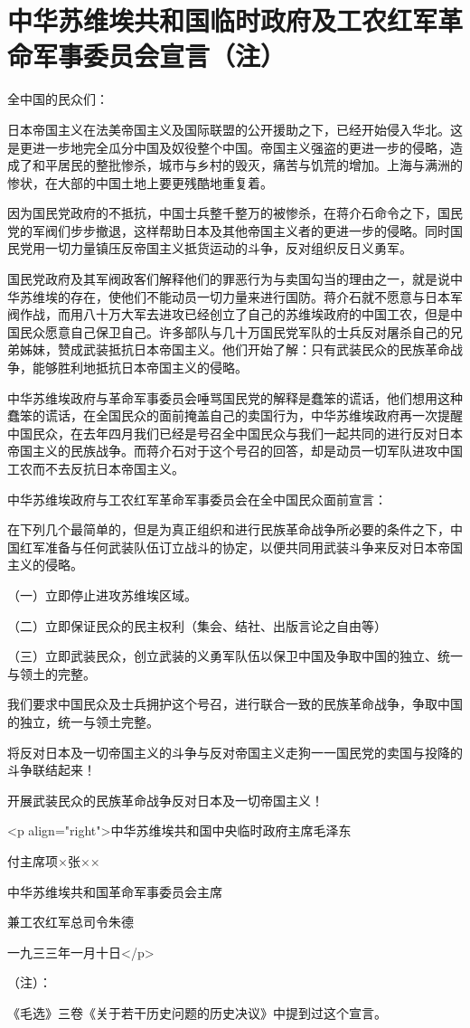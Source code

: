 \section[中华苏维埃共和国临时政府及工农红军革命军事委员会宣言（注）（一九三三年一月十日）]{中华苏维埃共和国临时政府及工农红军革命军事委员会宣言（注）}


全中国的民众们：

日本帝国主义在法美帝国主义及国际联盟的公开援助之下，已经开始侵入华北。这是更进一步地完全瓜分中国及奴役整个中国。帝国主义强盗的更进一步的侵略，造成了和平居民的整批惨杀，城市与乡村的毁灭，痛苦与饥荒的增加。上海与满洲的惨状，在大部的中国土地上要更残酷地重复着。

因为国民党政府的不抵抗，中国士兵整千整万的被惨杀，在蒋介石命令之下，国民党的军阀们步步撤退，这样帮助日本及其他帝国主义者的更进一步的侵略。同时国民党用一切力量镇压反帝国主义抵货运动的斗争，反对组织反日义勇军。

国民党政府及其军阀政客们解释他们的罪恶行为与卖国勾当的理由之一，就是说中华苏维埃的存在，使他们不能动员一切力量来进行国防。蒋介石就不愿意与日本军阀作战，而用八十万大军去进攻已经创立了自己的苏维埃政府的中国工农，但是中国民众愿意自己保卫自己。许多部队与几十万国民党军队的士兵反对屠杀自己的兄弟姊妹，赞成武装抵抗日本帝国主义。他们开始了解：只有武装民众的民族革命战争，能够胜利地抵抗日本帝国主义的侵略。

中华苏维埃政府与革命军事委员会唾骂国民党的解释是蠢笨的谎话，他们想用这种蠢笨的谎话，在全国民众的面前掩盖自己的卖国行为，中华苏维埃政府再一次提醒中国民众，在去年四月我们已经是号召全中国民众与我们一起共同的进行反对日本帝国主义的民族战争。而蒋介石对于这个号召的回答，却是动员一切军队进攻中国工农而不去反抗日本帝国主义。

中华苏维埃政府与工农红军革命军事委员会在全中国民众面前宣言：

在下列几个最简单的，但是为真正组织和进行民族革命战争所必要的条件之下，中国红军准备与任何武装队伍订立战斗的协定，以便共同用武装斗争来反对日本帝国主义的侵略。

（一）立即停止进攻苏维埃区域。

（二）立即保证民众的民主权利（集会、结社、出版言论之自由等）

（三）立即武装民众，创立武装的义勇军队伍以保卫中国及争取中国的独立、统一与领土的完整。

我们要求中国民众及士兵拥护这个号召，进行联合一致的民族革命战争，争取中国的独立，统一与领土完整。

将反对日本及一切帝国主义的斗争与反对帝国主义走狗一一国民党的卖国与投降的斗争联结起来！

开展武装民众的民族革命战争反对日本及一切帝国主义！

<p align="right">中华苏维埃共和国中央临时政府主席毛泽东

付主席项×张××

中华苏维埃共和国革命军事委员会主席

兼工农红军总司令朱德

一九三三年一月十日</p>

（注）：

《毛选》三卷《关于若干历史问题的历史决议》中提到过这个宣言。

